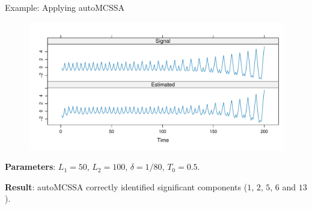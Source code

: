 \documentclass[notheorems, handout]{beamer}
\begin{document}
\begin{frame}{Example: Applying autoMCSSA}
	\begin{figure}
		\centering
		\includegraphics[width=\textwidth]{../paper/img/auto_mcssa_result.pdf}
	\end{figure}
	\textbf{Parameters}: $L_1=50$, $L_2=100$, $\delta=1/80$, $T_0=0.5$.\medskip

	\textbf{Result}: autoMCSSA correctly identified significant components ($1$, $2$, $5$, $6$ and $13$).
\end{frame}


\end{document}
